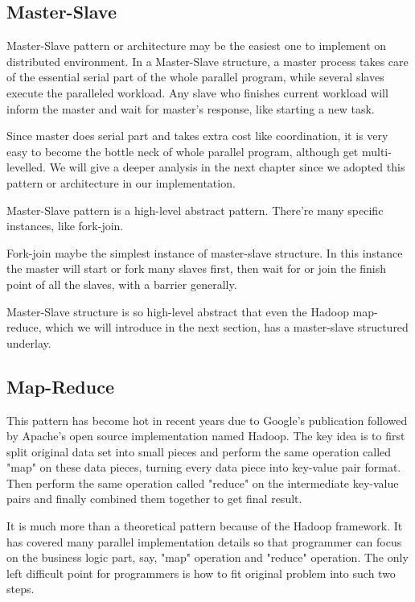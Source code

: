 \documentclass[12pt,a4paper]{report}
\begin{document}
\subsection{Master-Slave}

Master-Slave pattern or architecture may be the easiest one to implement on distributed environment. In a Master-Slave structure, a master process takes care of the essential serial part of the whole parallel program, while several slaves execute the paralleled workload. Any slave who finishes current workload will inform the master and wait for master's response, like starting a new task.

Since master does serial part and takes extra cost like coordination, it is very easy to become the bottle neck of whole parallel program, although get multi-levelled. We will give a deeper analysis in the next chapter since we adopted this pattern or architecture in our implementation.

Master-Slave pattern is a high-level abstract pattern. There're many specific instances, like fork-join. 

Fork-join maybe the simplest instance of master-slave structure. In this instance the master will start or fork many slaves first, then wait for or join the finish point of all the slaves, with a barrier generally.

Master-Slave structure is so high-level abstract that even the Hadoop map-reduce, which we will introduce in the next section, has a master-slave structured underlay.

\subsection{Map-Reduce}

This pattern has become hot in recent years due to Google's publication \cite{google-map-reduce} followed by Apache's open source implementation named Hadoop. The key idea is to first split original data set into small pieces and perform the same operation called "map" on these data pieces, turning every data piece into key-value pair format. Then perform the same operation called "reduce" on the intermediate key-value pairs and finally combined them together to get final result.

It is much more than a theoretical pattern because of the Hadoop framework. It has covered many parallel implementation details so that programmer can focus on the business logic part, say, "map" operation and "reduce" operation. The only left difficult point for programmers is how to fit original problem into such two steps.
\end{document}
